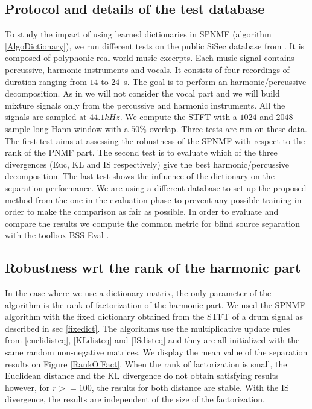 \documentclass[journal]{IEEEtran}
\begin{document}
\subsection{Protocol and details of the test database}


To study the impact of using learned dictionaries in SPNMF (algorithm \ref{AlgoDictionary}), we run different tests on the public SiSec database from \cite{SiSec10}. It is composed of polyphonic real-world music excerpts. Each music signal contains percussive, harmonic instruments and vocals. It consists of four recordings of duration ranging from $14$ to $24$~s. The goal is to perform an harmonic/percussive decomposition. As in \cite{canadas2014percussive} we will not consider the vocal part and we will build mixture signals only from the percussive and harmonic instruments. All the signals are sampled at $44.1kHz$. We compute the STFT with a $1024$ and $2048$ sample-long Hann window with a $50\%$ overlap.
Three tests are run on these data. The first test aims at assessing the robustness of the SPNMF with respect to the rank of the PNMF part. The second test is to evaluate which of the three divergences (Euc, KL and IS respectively) give the best harmonic/percussive decomposition. The last test shows the influence of the dictionary on the separation performance. We are using a different database to set-up the proposed method from the one in the evaluation phase to prevent any possible training in order to make the comparison as fair as possible. 
In order to evaluate and compare the results we compute the common metric for blind source separation with the toolbox BSS-Eval \cite{bsseval}. 


\subsection{Robustness wrt the rank of the harmonic part}\label{setup:rank}

In the case where we use a dictionary matrix, the only parameter of the algorithm is the rank of factorization of the harmonic part. We used the SPNMF algorithm with the fixed dictionary obtained from the STFT of a drum signal as described in sec \ref{fixedict}. The algorithms use the multiplicative update rules from \ref{euclidisteq}, \ref{KLdisteq} and \ref{ISdisteq} and they are all initialized with the same random non-negative matrices. 
We display the mean value of the separation results on Figure \ref{RankOfFact}. When the rank of factorization is small, the Euclidean distance and the KL divergence do not obtain satisfying results however, for $r>=100$, the results for both distance are stable. With the IS divergence, the results are independent of the size of the factorization.
\end{document}
